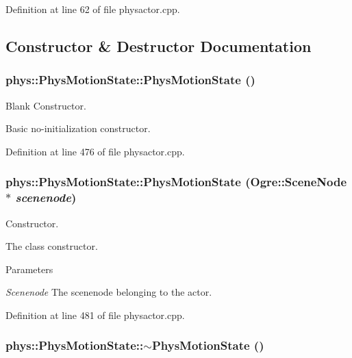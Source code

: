 Definition at line 62 of file physactor.cpp.



\subsection{Constructor \& Destructor Documentation}
\hypertarget{classphys_1_1PhysMotionState_ac685ae94d7ee7740aaee8c1a1132b27a}{
\subsubsection[{PhysMotionState}]{\setlength{\rightskip}{0pt plus 5cm}phys::PhysMotionState::PhysMotionState ()}}
\label{dc/d0d/classphys_1_1PhysMotionState_ac685ae94d7ee7740aaee8c1a1132b27a}


Blank Constructor. 

Basic no-\/initialization constructor. 

Definition at line 476 of file physactor.cpp.

\hypertarget{classphys_1_1PhysMotionState_a505aa5ea3bbaba4710924f030f4ed008}{
\subsubsection[{PhysMotionState}]{\setlength{\rightskip}{0pt plus 5cm}phys::PhysMotionState::PhysMotionState (Ogre::SceneNode $\ast$ {\em scenenode})}}
\label{dc/d0d/classphys_1_1PhysMotionState_a505aa5ea3bbaba4710924f030f4ed008}


Constructor. 

The class constructor. 
\begin{DoxyParams}{Parameters}
\item[{\em Scenenode}]The scenenode belonging to the actor. \end{DoxyParams}


Definition at line 481 of file physactor.cpp.

\hypertarget{classphys_1_1PhysMotionState_a20798e3dce2d71a938c3607a8610eaac}{
\subsubsection[{$\sim$PhysMotionState}]{\setlength{\rightskip}{0pt plus 5cm}phys::PhysMotionState::$\sim$PhysMotionState ()}}
\label{dc/d0d/classphys_1_1PhysMotionState_a20798e3dce2d71a938c3607a8610eaac}



